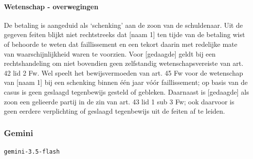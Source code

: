 \documentclass[
  dutch,
  a4paper,
]{article}
\begin{document}
\paragraph{Wetenschap - overwegingen}\label{wetenschap---overwegingen-28}

De betaling is aangeduid als `schenking' aan de zoon van de schuldenaar. Uit de gegeven feiten blijkt niet rechtstreeks dat {[}naam 1{]} ten tijde van de betaling wist of behoorde te weten dat faillissement en een tekort daarin met redelijke mate van waarschijnlijkheid waren te voorzien. Voor {[}gedaagde{]} geldt bij een rechtshandeling om niet bovendien geen zelfstandig wetenschapsvereiste van art. 42 lid 2 Fw. Wel speelt het bewijsvermoeden van art. 45 Fw voor de wetenschap van {[}naam 1{]} bij een schenking binnen één jaar vóór faillissement; op basis van de casus is geen geslaagd tegenbewijs gesteld of gebleken. Daarnaast is {[}gedaagde{]} als zoon een gelieerde partij in de zin van art. 43 lid 1 sub 3 Fw; ook daarvoor is geen eerdere verplichting of geslaagd tegenbewijs uit de feiten af te leiden.

\newpage


\subsubsection{Gemini}\label{gemini-9}

\texttt{gemini-3.5-flash}
\end{document}
